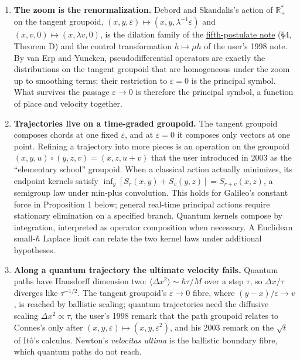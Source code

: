 \documentclass[11pt,a4paper]{article}
\newcommand{\tightlist}{\setlength{\itemsep}{0pt}\setlength{\parskip}{0pt}}
\begin{document}
\begin{enumerate}
\def\labelenumi{\arabic{enumi}.}
\tightlist
\item
  \textbf{The zoom is the renormalization.} Debord and Skandalis's
  action of \(\mathbb R_+^*\) on the tangent groupoid,
  \((x,y,\varepsilon)\mapsto(x,y,\lambda^{-1}\varepsilon)\) and
  \((x,v,0)\mapsto(x,\lambda v,0)\), is the dilation family of the
  \href{principia-fifth-postulate.md}{fifth-postulate note} (§4, Theorem
  D) and the control transformation \(h\mapsto\mu h\) of the user's 1998
  note. By van Erp and Yuncken, pseudodifferential operators are exactly
  the distributions on the tangent groupoid that are homogeneous under
  the zoom up to smoothing terms; their restriction to \(\varepsilon=0\)
  is the principal symbol. What survives the passage \(\varepsilon\to0\)
  is therefore the principal symbol, a function of place and velocity
  together.
\item
  \textbf{Trajectories live on a time-graded groupoid.} The tangent
  groupoid composes chords at one fixed \(\varepsilon\), and at
  \(\varepsilon=0\) it composes only vectors at one point. Refining a
  trajectory into more pieces is an operation on the groupoid
  \((x,y,u)\circ(y,z,v)=(x,z,u+v)\) that the user introduced in 2003 as
  the ``elementary school'' groupoid. When a classical action actually
  minimizes, its endpoint kernels satisfy
  \(\inf_y[S_r(x,y)+S_v(y,z)]=S_{r+v}(x,z)\), a semigroup law under
  min-plus convolution. This holds for Galileo's constant force in
  Proposition 1 below; general real-time principal actions require
  stationary elimination on a specified branch. Quantum kernels compose
  by integration, interpreted as operator composition when necessary. A
  Euclidean small-\(\hbar\) Laplace limit can relate the two kernel laws
  under additional hypotheses.
\item
  \textbf{Along a quantum trajectory the ultimate velocity fails.}
  Quantum paths have Hausdorff dimension two:
  \(\langle\Delta x^2\rangle\sim\hbar\tau/M\) over a step \(\tau\), so
  \(\Delta x/\tau\) diverges like \(\tau^{-1/2}\). The tangent
  groupoid's \(\varepsilon\to0\) fibre, where
  \((y-x)/\varepsilon\to v\), is reached by ballistic scaling; quantum
  trajectories need the diffusive scaling \(\Delta x^2\propto\tau\), the
  user's 1998 remark that the path groupoid relates to Connes's only
  after \((x,y,\varepsilon)\mapsto(x,y,\varepsilon^2)\), and his 2003
  remark on the \(\sqrt t\) of Itô's calculus. Newton's \emph{velocitas
  ultima} is the ballistic boundary fibre, which quantum paths do not
  reach.
\end{enumerate}
\end{document}
